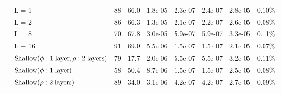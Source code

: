 \begin{tabular}{llrrrrrrr}
                         & L = 1 &                       88 &                      66.0 &                                   1.8e-05 &                                  2.3e-07 &                                 2.4e-07 &                                            2.8e-05 &                                             0.10\% \\
                         & L = 2 &                       86 &                      66.3 &                                   1.3e-05 &                                  2.1e-07 &                                 2.2e-07 &                                            2.6e-05 &                                             0.08\% \\
                         & L = 8 &                       70 &                      67.8 &                                   3.0e-05 &                                  5.9e-07 &                                 5.9e-07 &                                            3.3e-05 &                                             0.11\% \\
                         & L = 16 &                       91 &                      69.9 &                                   5.5e-06 &                                  1.5e-07 &                                 1.5e-07 &                                            2.1e-05 &                                             0.07\% \\
                         & $\textup{Shallow} (\phi:\textup{1 layer},  \rho:\textup{2 layers})$ &                       79 &                      17.7 &                                   2.0e-06 &                                  5.5e-07 &                                 5.5e-07 &                                            3.2e-05 &                                             0.11\% \\
                         & $\textup{Shallow} (\phi:\textup{1 layer})$ &                       58 &                      50.4 &                                   8.7e-06 &                                  1.5e-07 &                                 1.5e-07 &                                            2.5e-05 &                                             0.08\% \\
                         & $\textup{Shallow} (\rho:\textup{2 layers})$ &                       89 &                      34.0 &                                   3.1e-06 &                                  4.2e-07 &                                 4.2e-07 &                                            2.7e-05 &                                             0.09\% \\

\end{tabular}
